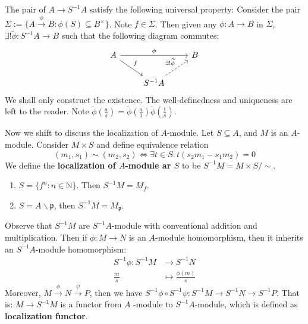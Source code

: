 \documentclass[12pt]{article}
\theoremstyle{definition}
\theoremstyle{plain}
\newcommand{\nat}{\mathbb{N}}
\renewcommand{\tilde}{\widetilde}
\begin{document}
The pair of $A\to S^{-1}A$ satisfy the following universal property:
 Consider the pair $\Sigma:=\{A\overset{\phi}{\to}B: \phi(S)\subseteq B^\times\}$. Note $f\in \Sigma$. Then given any $\phi:A\to B$ in $\Sigma$, $\exists ! \tilde{\phi}: S^{-1}A \to B$ such that the following diagram commutes:
\begin{equation}
  \begin{tikzcd}
    A\ar{rr}{\phi} \ar{rd}{f}& &B\\
    &S^{-1}A\ar[dashed]{ru}{\exists ! \tilde{\phi}}
  \end{tikzcd}
\end{equation}
\proof We shall only construct the existence. The well-definedness and uniqueness are left to the reader. Note $\tilde{\phi}(\frac{a}{s})=\tilde{\phi}(\frac{a}{1})\tilde{\phi}(\frac{1}{s})$.

\medskip
Now we shift to discuss the localization of $A$-module. Let $S\subseteq A$, and $M$ is an $A$-module. Consider $M\times S$ and define equivalence relation
$$(m_1, s_1)\sim(m_2, s_2) \iff \exists t\in S: t(s_2m_1-s_1m_2)=0$$
\Def We define the \textbf{localization of $A$-module ar $S$} to be $S^{-1}M=M\times S/\sim$.
\Exe \leavevmode
\begin{enumerate}
  \item $S=\{f^n:n\in \nat\}$. Then $S^{-1}M=M_f$.
  \item $S=A\backslash \mathfrak{p}$, then $S^{-1}M=M_\mathfrak{p}$.
\end{enumerate}
Observe that $S^{-1}M$ are $S^{-1}A$-module with conventional addition and multiplication. Then if $\phi:M\to N$ is an $A$-module homomorphism, then it inherits an $S^{-1}A$-module homomorphism:
\begin{align*}
  S^{-1}\phi:S^{-1}M &\to S^{-1}N\\
  \frac{m}{s}&\mapsto \frac{\phi(m)}{s}
\end{align*}
Moreover, $M\overset{\phi}{\to} N\overset{\psi}{\to} P$, then we have $S^{-1}\phi\circ S^{-1}\psi:S^{-1}M\to S^{-1}N\to S^{-1}P$. That is:
\Def $M\to S^{-1}M$ is a functor from $A$ -module to $S^{-1}A$-module, which is defined as \textbf{localization functor}.
\end{document}
